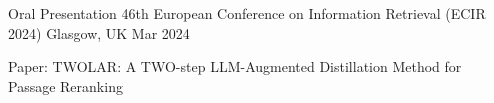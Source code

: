 

\begin{cventries}

  \cventry
    {Oral Presentation} %
    {46th European Conference on Information Retrieval (ECIR 2024)} %
    {Glasgow, UK} %
    {Mar 2024} %
    {
      \begin{cvitems} %
        \item {Paper: TWOLAR: A TWO-step LLM-Augmented Distillation Method for Passage Reranking}
      \end{cvitems}
    }


\end{cventries}

